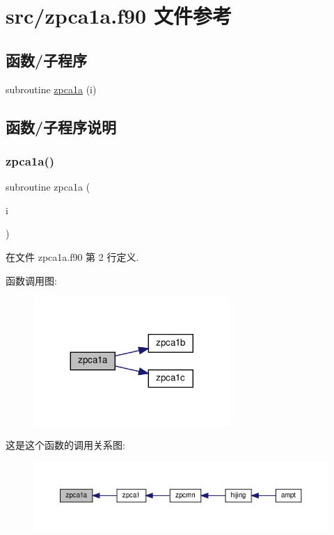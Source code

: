 \hypertarget{zpca1a_8f90}{}\section{src/zpca1a.f90 文件参考}
\label{zpca1a_8f90}
\subsection*{函数/子程序}
\begin{DoxyCompactItemize}
\item 
subroutine \mbox{\hyperlink{zpca1a_8f90_a435ae8b99bda2fea40baeb685ded194a}{zpca1a}} (i)
\end{DoxyCompactItemize}


\subsection{函数/子程序说明}
\mbox{\label{zpca1a_8f90_a435ae8b99bda2fea40baeb685ded194a}} 
\subsubsection{\texorpdfstring{zpca1a()}{zpca1a()}}
{\footnotesize\ttfamily subroutine zpca1a (\begin{DoxyParamCaption}\item[{}]{i }\end{DoxyParamCaption})}



在文件 zpca1a.\+f90 第 2 行定义.

函数调用图\+:
\nopagebreak
\begin{figure}[H]
\begin{center}
\leavevmode
\includegraphics[width=212pt]{zpca1a_8f90_a435ae8b99bda2fea40baeb685ded194a_cgraph}
\end{center}
\end{figure}
这是这个函数的调用关系图\+:
\nopagebreak
\begin{figure}[H]
\begin{center}
\leavevmode
\includegraphics[width=350pt]{zpca1a_8f90_a435ae8b99bda2fea40baeb685ded194a_icgraph}
\end{center}
\end{figure}
